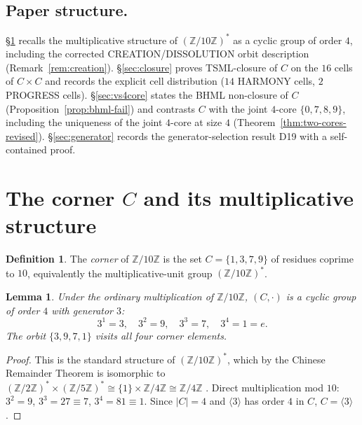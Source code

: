 \documentclass[11pt,reqno]{amsart}
\theoremstyle{plain}
\newtheorem{lemma}[theorem]{Lemma}
\theoremstyle{definition}
\newtheorem{definition}[theorem]{Definition}
\theoremstyle{remark}
\newcommand{\Z}{\mathbb{Z}}
\begin{document}
\subsection{Paper structure.}
\S\ref{sec:units} recalls the multiplicative structure of
$(\Z/10\Z)^*$ as a cyclic group of order $4$, including the corrected
CREATION/DISSOLUTION orbit description (Remark~\ref{rem:creation}).
\S\ref{sec:closure} proves TSML-closure of $C$ on the $16$ cells of
$C \times C$ and records the explicit cell distribution
($14$ HARMONY cells, $2$ PROGRESS cells).  \S\ref{sec:vs4core} states
the BHML non-closure of $C$ (Proposition~\ref{prop:bhml-fail}) and
contrasts $C$ with the joint $4$-core $\{0, 7, 8, 9\}$, including the
uniqueness of the joint $4$-core at size $4$
(Theorem~\ref{thm:two-cores-revised}).  \S\ref{sec:generator} records
the generator-selection result D19 with a self-contained proof.

\section{The corner $C$ and its multiplicative structure}
\label{sec:units}

\begin{definition}\label{def:corner}
The \emph{corner} of $\Z/10\Z$ is the set $C = \{1, 3, 7, 9\}$ of
residues coprime to $10$, equivalently the multiplicative-unit group
$(\Z/10\Z)^*$.
\end{definition}

\begin{lemma}\label{lem:cyclic}
Under the ordinary multiplication of $\Z/10\Z$, $(C, \cdot)$ is a
cyclic group of order $4$ with generator $3$:
\[
3^1 = 3, \quad 3^2 = 9, \quad 3^3 = 7, \quad 3^4 = 1 = e.
\]
The orbit $\{3, 9, 7, 1\}$ visits all four corner elements.
\end{lemma}

\begin{proof}
This is the standard structure of $(\Z/10\Z)^*$, which by the Chinese
Remainder Theorem is isomorphic to
$(\Z/2\Z)^* \times (\Z/5\Z)^* \cong \{1\} \times \Z/4\Z \cong \Z/4\Z$
\cite[\S 3.4]{IrelandRosen}.  Direct multiplication mod $10$:
$3^2 = 9$, $3^3 = 27 \equiv 7$, $3^4 = 81 \equiv 1$.  Since $|C| = 4$
and $\langle 3 \rangle$ has order $4$ in $C$,
$C = \langle 3 \rangle$.
\end{proof}
\end{document}
